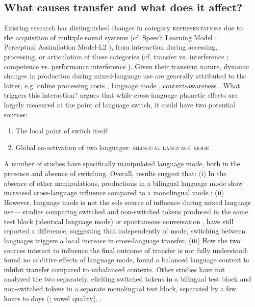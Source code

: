 \documentclass[12 pt]{article}
\begin{document}
\subsection{What causes transfer and what does it affect?}\label{causes}

Existing research has distinguished changes in category \textsc{representations} due to the acquisition of multiple sound systems (cf. Speech Learning Model \citep{flege1995second,flege2007language}; Perceptual Assimilation Model-L2 \citep{best2007nonnative}), from interaction during accessing, processing, or articulation of these categories (cf. transfer vs. interference \citep{grosjean2012attempt}; competence vs. performance interference \citep{paradis1993linguistic}). 
Given their transient nature, dynamic changes in production during mixed-language use are generally attributed to the latter, e.g. online processing costs \citep[][VOT]{olson2013bilingual,tsui2019impact,vsimavckova2015immediate}, language mode \citep[][vowel quality]{simonet2014phonetic}, context-awareness \citep[][phonological variables]{khattab2013phonetic}. What triggers this interaction? \cite{olson2016role} argues that while cross-language phonetic effects are largely measured at the point of language switch, it could have two potential sources:
\begin{enumerate}
	\item The local point of switch itself
	\item Global co-activation of two languages: \textsc{bilingual language mode} \citep{grosjean1998studying} 
\end{enumerate}

A number of studies have specifically manipulated language mode, both in the presence and absence of switching. Overall, results suggest that: (i) In the absence of other manipulations, productions in a bilingual language mode show increased cross-language influence compared to a monolingual mode \citep[][vowel quality]{simonet2020increased,simonet2014phonetic}; (ii) However, language mode is not the sole source of influence during mixed language use--- studies comparing switched and non-switched tokens produced in the same test block (identical language mode) \citep[][VOT]{olson2016role,tsui2019impact} or spontaneous conversation \citep[][VOT]{piccinini2015voice}, have still reported a difference, suggesting that independently of mode, switching between languages triggers a local increase in cross-language transfer. (iii) How the two sources interact to influence the final outcome of transfer is not fully understood: \cite[][VOT]{olson2016role} found no additive effects of language mode, \cite[][VOT]{olson2013bilingual} found a balanced language context to inhibit transfer compared to unbalanced contexts.  Other studies have not analyzed the two separately, eliciting switched tokens in a bilingual test block and non-switched tokens in a separate monolingual test block, separated by a few hours to days (\cite{elias2017effects}; vowel quality), \citep[][VOT]{schwartz2015language, bullock2009trying,antoniou2011inter, vsimavckova2015immediate,vsimavckova2018patterns}.
\end{document}
